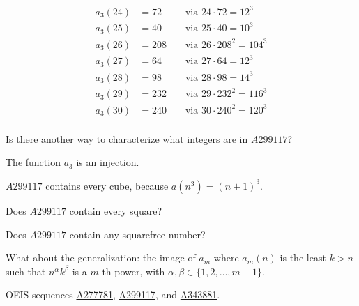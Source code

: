 \documentclass{article}
\begin{document}
\begin{multicols}{3}
\begin{alignat*}{2}
      a_3(24) &= 72  &&\text{ via } 24 \cdot 72    = 12^3 \\
      a_3(25) &= 40  &&\text{ via } 25 \cdot 40    = 10^3 \\
      a_3(26) &= 208 &&\text{ via } 26 \cdot 208^2 = 104^3 \\
      a_3(27) &= 64  &&\text{ via } 27 \cdot 64    = 12^3 \\
      a_3(28) &= 98  &&\text{ via } 28 \cdot 98    = 14^3 \\
      a_3(29) &= 232 &&\text{ via } 29 \cdot 232^2 = 116^3 \\
      a_3(30) &= 240 &&\text{ via } 30 \cdot 240^2 = 120^3 \\
    \end{alignat*}
  \end{multicols}
\begin{question}
  Is there another way to characterize what integers are in $A299117$?
\end{question}

\begin{note}
  The function $a_3$ is an injection.

  $A299117$ contains every cube, because $a(n^3) = (n + 1)^3$.
\end{note}

\begin{related}
  \item Does $A299117$ contain every square?
  \item Does $A299117$ contain any squarefree number?
  \item What about the generalization: the image of $a_m$ where $a_m(n)$
    is the least $k > n$ such that $n^\alpha k^\beta$ is a $m$-th power,
    with $\alpha, \beta \in \{1,2,\dots,m-1\}$.
\end{related}

\begin{references}
  \item OEIS sequences
    \href{https://oeis.org/A277781}{A277781},
    \href{https://oeis.org/A299117}{A299117}, and
    \href{https://oeis.org/A343881}{A343881}.
\end{references}
\end{document}

